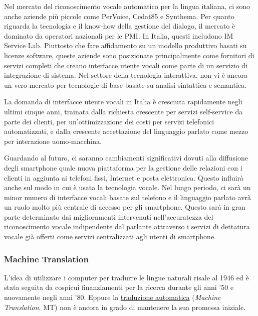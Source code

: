 \documentclass[]{../../metanetpaper}
\begin{document}
\begin{multicols}{2}
Nel mercato del riconoscimento vocale automatico per la lingua italiana, ci sono anche aziende pi\`{u} piccole come PerVoice, Cedat85 e Synthema. Per quanto riguarda la tecnologia e il know-how della gestione del dialogo, il mercato \`{e} dominato da operatori nazionali per le PMI. In Italia, questi includono IM Service Lab. Piuttosto che fare affidamento su un modello produttivo basati su licenze software, queste aziende sono posizionate principalmente come fornitori di servizi completi che creano interfacce utente vocali come parte di un servizio di integrazione di sistema. Nel settore della tecnologia interattiva, non vi \`{e} ancora un vero mercato per tecnologie di base basate su analisi sintattica e semantica.

La domanda di interfacce utente vocali in Italia \`{e} cresciuta rapidamente negli ultimi cinque anni, trainata dalla richiesta crescente per servizi self-service da parte dei clienti, per un'ottimizzazione dei costi per servizi telefonici automatizzati, e dalla crescente accettazione del linguaggio parlato come mezzo per interazione uomo-macchina.

Guardando al futuro, ci saranno cambiamenti significativi dovuti alla diffusione degli smartphone quale nuova piattaforma per la gestione delle relazioni con i clienti in aggiunta ai telefoni fissi, Internet e posta elettronica. Questo influir\`{a} anche sul modo in cui \`{e} usata la tecnologia vocale. Nel lungo periodo, ci sar\`{a} un minor numero di interfacce vocali basate sul telefono e il linguaggio parlato avr\`{a} un ruolo molto pi\`{u} centrale di accesso per gli smartphone. Questo sar\`{a} in gran parte determinato dai miglioramenti intervenuti nell'accuratezza del riconoscimento vocale indipendente dal parlante attraverso i servizi di dettatura vocale gi\`{a} offerti come servizi centralizzati agli utenti di smartphone.



\subsubsection{Machine Translation}

L'idea di utilizzare i computer per tradurre le lingue naturali risale al 1946 ed \`{e} stata seguita da cospicui finanziamenti per la ricerca durante gli anni '50 e nuovamente negli anni '80. Eppure la \underline{traduzione automatica} (\emph{Machine Translation}, MT) non \`{e} ancora in grado di mantenere la sua promessa iniziale.





\end{multicols}
\end{document}
